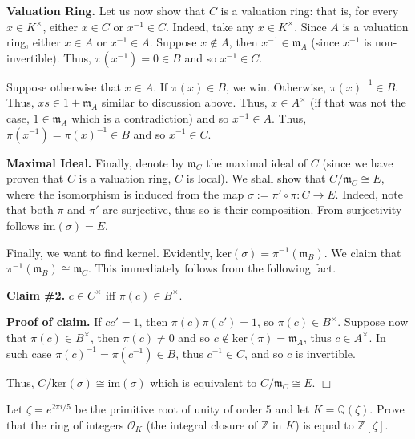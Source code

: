 \documentclass{template}
\newcommand{\qedwhite}{\hfill \ensuremath{\Box}}
\begin{document}
\textcolor{blue!70!black}{\textbf{Valuation Ring.}} Let us now show that $C$ is
a valuation ring: that is, for every $x \in K^{\times}$, either $x \in C$ or
$x^{-1} \in C$. Indeed, take any $x \in K^{\times}$. Since $A$ is a valuation
ring, either $x \in A$ or $x^{-1} \in A$. Suppose $x \not\in A$, then $x^{-1}
\in \mathfrak{m}_A$ (since $x^{-1}$ is non-invertible). Thus, $\pi(x^{-1}) = 0
\in B$ and so $x^{-1} \in C$.  

Suppose otherwise that $x \in A$. If $\pi(x) \in B$, we win. Otherwise,
$\pi(x)^{-1} \in B$. Thus, $xs \in 1 + \mathfrak{m}_A$ similar to discussion
above. Thus, $x \in A^{\times}$ (if that was not the case, $1 \in
\mathfrak{m}_A$ which is a contradiction) and so $x^{-1} \in A$. Thus,
$\pi(x^{-1}) = \pi(x)^{-1} \in B$ and so $x^{-1} \in C$.

\textcolor{blue!70!black}{\textbf{Maximal Ideal.}} Finally, denote by
$\mathfrak{m}_C$ the maximal ideal of $C$ (since we have proven that $C$ is a
valuation ring, $C$ is local). We shall show that $C/\mathfrak{m}_C \cong E$,
where the isomorphism is induced from the map $\sigma := \pi' \circ \pi: C \to
E$. Indeed, note that both $\pi$ and $\pi'$ are surjective, thus so is their
composition. From surjectivity follows $\text{im}(\sigma) = E$. 

Finally, we want to find kernel. Evidently, $\text{ker}(\sigma) =
\pi^{-1}(\mathfrak{m}_B)$. We claim that $\pi^{-1}(\mathfrak{m}_B) \cong
\mathfrak{m}_C$. This immediately follows from the following fact.

\textbf{Claim \#2.} $c \in C^{\times}$ iff $\pi(c) \in B^{\times}$.

\textbf{Proof of claim.} If $cc'=1$, then $\pi(c)\pi(c')=1$, so $\pi(c) \in
B^{\times}$. Suppose now that $\pi(c) \in B^{\times}$, then $\pi(c) \neq 0$ and
so $c \not\in \text{ker}(\pi) = \mathfrak{m}_A$, thus $c \in A^{\times}$. In
such case $\pi(c)^{-1}=\pi(c^{-1}) \in B$, thus $c^{-1} \in C$, and so $c$ is
invertible.

Thus, $C/\text{ker}(\sigma) \cong \text{im}(\sigma)$ which is equivalent to
$C/\mathfrak{m}_C \cong E$. \qedwhite

\begin{problem}[Exercise 2]
    Let $\zeta = e^{2\pi i/5}$ be the primitive root of unity of order $5$ and
    let $K = \mathbb{Q}(\zeta)$. Prove that the ring of integers $\mathcal{O}_K$
    (the integral closure of $\mathbb{Z}$ in $K$) is equal to $\mathbb{Z}[\zeta]$.
\end{problem}
\end{document}
